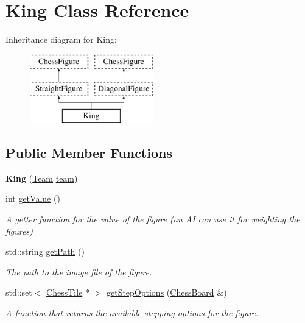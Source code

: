 \hypertarget{classKing}{}\section{King Class Reference}
\label{classKing}
Inheritance diagram for King\+:\begin{figure}[H]
\begin{center}
\leavevmode
\includegraphics[height=3.000000cm]{classKing}
\end{center}
\end{figure}
\subsection*{Public Member Functions}
\begin{DoxyCompactItemize}
\item 
\mbox{\label{classKing_a3e945491cb38d473fcd809c11c15129e}} 
{\bfseries King} (\mbox{\hyperlink{classChessFigure_a62f54318c1f28a08e6a6a2707f697a1d}{Team}} \mbox{\hyperlink{classChessFigure_ac7d0751a28c94d49927b9524390d1261}{team}})
\item 
\mbox{\label{classKing_a4778898c5534c04dd93194d22ef317c3}} 
int \mbox{\hyperlink{classKing_a4778898c5534c04dd93194d22ef317c3}{get\+Value}} ()
\begin{DoxyCompactList}\small\item\em A getter function for the value of the figure (an AI can use it for weighting the figures) \end{DoxyCompactList}\item 
\mbox{\label{classKing_a29a27a0f1280bb352d601d0aeeea13f1}} 
std\+::string \mbox{\hyperlink{classKing_a29a27a0f1280bb352d601d0aeeea13f1}{get\+Path}} ()
\begin{DoxyCompactList}\small\item\em The path to the image file of the figure. \end{DoxyCompactList}\item 
std\+::set$<$ \mbox{\hyperlink{classChessTile}{Chess\+Tile}} $\ast$ $>$ \mbox{\hyperlink{classKing_a69703f80ac8c30335e4d745ee11518d7}{get\+Step\+Options}} (\mbox{\hyperlink{classChessBoard}{Chess\+Board}} \&)
\begin{DoxyCompactList}\small\item\em A function that returns the available stepping options for the figure. \end{DoxyCompactList}\end{DoxyCompactItemize}
